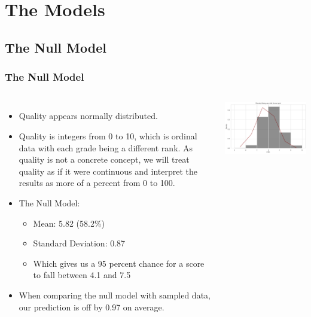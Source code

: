 \documentclass{beamer}
\begin{document}
	
	\section{The Models}
	
	\subsection{The Null Model}
	\begin{frame}
		\frametitle{The Null Model}
		\begin{small}
			\begin{columns}
				
				\begin{itemize}
					\item Quality appears normally distributed.
					\item Quality is integers from 0 to 10, which is ordinal data with each grade being a different rank.  As quality is not a concrete concept, we will treat quality as if it were continuous and interpret the results as more of a percent from 0 to 100.
					\item The Null Model:
					\begin{itemize}
						\item Mean: 5.82 (58.2\%)
						\item Standard Deviation: 0.87
						\item Which gives us a 95 percent chance for a score to fall between 4.1 and 7.5
					\end{itemize}
					\item When comparing the null model with sampled data, our prediction is off by 0.97 on average.
				\end{itemize}
				
				
				\includegraphics[width=\textwidth]{images/quality histogram.png}
			\end{columns}
		\end{small}
	\end{frame}
	
\end{document}
